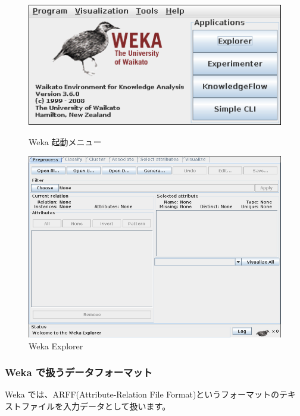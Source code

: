 \documentclass[mingoth,a4paper]{jsarticle}
\begin{document}
\begin{figure}[H]
\begin{minipage}{0.4\hsize}
 \begin{center}
 \includegraphics[width=1\hsize]{image201003/weka0.png}
 \caption{Weka 起動メニュー}
 \end{center}
\end{minipage}
\begin{minipage}{0.5\hsize}
 \begin{center}
 \includegraphics[width=1\hsize]{image201003/weka1.png}
 \caption{Weka Explorer}
 \end{center}
\end{minipage}
\end{figure}

\subsubsection{Weka で扱うデータフォーマット}

Weka では、ARFF(Attribute-Relation File Format)というフォーマットのテキ
ストファイルを入力データとして扱います。
\end{document}
